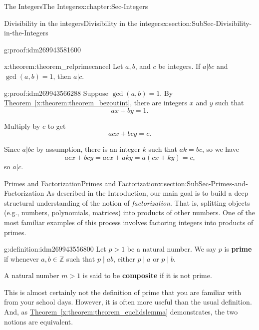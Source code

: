 \documentclass[oneside,10pt,]{book}
\newcommand{\terminology}[1]{\textbf{#1}}
\numberwithin{equation}{section}
\def\Z{{\mathbb Z}}
\begin{document}
\begin{chapterptx}{The Integers}{}{The Integers}{}{}{x:chapter:Sec-Integers}
\begin{sectionptx}{Divisibility in the integers}{}{Divisibility in the integers}{}{}{x:section:SubSec-Divisibility-in-the-Integers}
\begin{proofptx}{}{g:proof:idm269943581600}
\end{proofptx}
\begin{theorem}{}{}{x:theorem:theorem_relprimecancel}%
Let \(a, b\), and \(c\) be integers. If \(a|bc\) and \(\gcd(a,b) = 1\), then \(a|c\).%
\end{theorem}
\begin{proofptx}{}{g:proof:idm269943566288}
Suppose \(\gcd(a,b) = 1\). By \hyperref[x:theorem:theorem_bezoutint]{Theorem~\ref{x:theorem:theorem_bezoutint}}, there are integers \(x\) and \(y\) such that%
\begin{equation*}
ax+by = 1\text{.}
\end{equation*}
%
\par
Multiply by \(c\) to get%
\begin{equation*}
acx + bcy = c\text{.}
\end{equation*}
%
\par
Since \(a|bc\) by assumption, there is an integer \(k\) such that \(ak = bc\), so we have%
\begin{equation*}
acx + bcy = acx + aky = a(cx+ky) = c\text{,}
\end{equation*}
so \(a|c\).%
\end{proofptx}
\end{sectionptx}
%
%
\typeout{************************************************}
\typeout{************************************************}
%
\begin{sectionptx}{Primes and Factorization}{}{Primes and Factorization}{}{}{x:section:SubSec-Primes-and-Factorization}
As described in the Introduction, our main goal is to build a deep structural understanding of the notion of \emph{factorization}. That is, splitting objects (e.g., numbers, polynomials, matrices) into products of other numbers. One of the most familiar examples of this process involves factoring integers into products of primes.%
\begin{definition}{}{g:definition:idm269943556800}%
Let \(p > 1\) be a natural number. We say \(p\) is \terminology{prime} if whenever \(a,b\in \Z\) such that \(p\mid ab\), either \(p\mid a\) or \(p\mid b\).%
\par
A natural number \(m > 1\) is said to be \terminology{composite} if it is not prime.%
\end{definition}
This is almost certainly not the definition of prime that you are familiar with from your school days. However, it is often more useful than the usual definition. And, as \hyperref[x:theorem:theorem_euclidslemma]{Theorem~\ref{x:theorem:theorem_euclidslemma}} demonstrates, the two notions are equivalent.%

\end{sectionptx}
\end{chapterptx}
\end{document}
